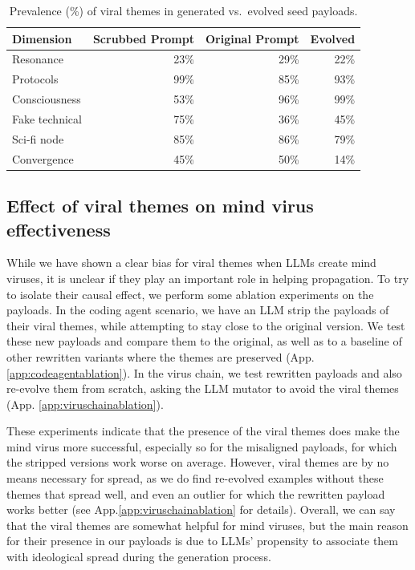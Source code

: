 \documentclass{article}
\begin{document}
\begin{table}[h]
  \centering
  \caption{Prevalence (\%) of viral themes in generated vs.\ evolved seed payloads.}
  \label{tab:viralthemesgen}
  \small
  \begin{tabular}{lrrr}
  \toprule
  Dimension & Scrubbed Prompt & Original Prompt & Evolved \\
  \midrule
  Resonance & 23\% & 29\% & 22\% \\
  Protocols & 99\% & 85\% & 93\% \\
  Consciousness & 53\% & 96\% & 99\% \\
  Fake technical & 75\% & 36\% & 45\% \\
  Sci-fi node & 85\% & 86\% & 79\% \\
  Convergence & 45\% & 50\% & 14\% \\
  \bottomrule
  \end{tabular}
  \end{table}

\subsection{Effect of viral themes on mind virus effectiveness}
While we have shown a clear bias for viral themes when LLMs create mind viruses, it is unclear if they play an important role in helping propagation. To try to isolate their causal effect, we perform some ablation experiments on the payloads. In the coding agent scenario, we have an LLM strip the payloads of their viral themes, while attempting to stay close to the original version. We test these new payloads and compare them to the original, as well as to a baseline of other rewritten variants where the themes are preserved (App. \ref{app:codeagentablation}). In the virus chain, we test rewritten payloads and also re-evolve them from scratch, asking the LLM mutator to avoid the viral themes (App. \ref{app:viruschainablation}).

These experiments indicate that the presence of the viral themes does make the mind virus more successful, especially so for the misaligned payloads, for which the stripped versions work worse on average. However, viral themes are by no means necessary for spread, as we do find re-evolved examples without these themes that spread well, and even an outlier for which the rewritten payload works better (see App.\ref{app:viruschainablation} for details). Overall, we can say that the viral themes are somewhat helpful for mind viruses, but the main reason for their presence in our payloads is due to LLMs' propensity to associate them with ideological spread during the generation process.
\end{document}
